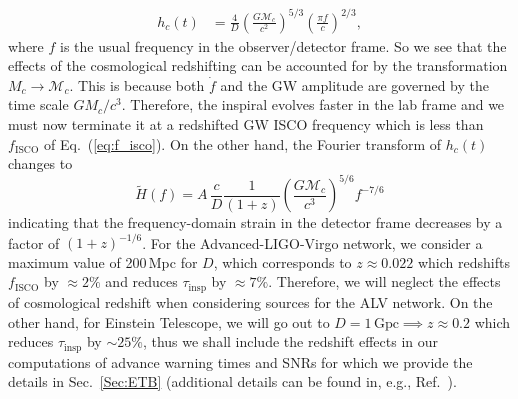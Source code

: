 \documentclass[prd,amsmath,amssymb,aps,floats,amsfonts,notitlepage,superscriptaddress,eqsecnum,nofootinbib,10pt]{revtex4-1}
\newcommand{\f}{\frac}
\newcommand{\be}{\begin{equation}}
\newcommand{\ee}{\end{equation}}
\begin{document}
\begin{enumerate}
\begin{align}
h_c(t) & = \f{4}{D}\left(\f{G \mathcal{M}_c}{c^2}\right)^{5/3}\left(\frac{\pi f}{c}\right)^{2/3} \label{eq:strain_TD_redshifted},
\end{align}
%
where $f$ is the usual frequency in the observer/detector frame.
So we see that the effects of the cosmological redshifting can be accounted for by the transformation $M_c\rightarrow \mathcal{M}_c$.
This is because both $\dot{f}$ and the GW amplitude are governed by the time scale $G M_c/c^3$.
Therefore, the inspiral evolves faster in the lab frame %
and we must now terminate it at a redshifted GW ISCO frequency which is less than $f_\text{ISCO}$ of Eq.~(\ref{eq:f_isco}).
On the other hand, the Fourier transform of $h_c(t)$ changes to 
%
\be
\tilde{H}(f) = A\, \f{c}{D} \f{1}{(1+z)} \left(\f{G \mathcal{M}_c}{c^3}\right)^{5/6} f^{-7/6}
\ee
indicating that the frequency-domain strain in the detector frame decreases by a factor of $(1+z)^{-1/6}$. %
%
For the Advanced-LIGO-Virgo network,
we consider a maximum value of 200\,Mpc for $D$,
which corresponds to $z \approx 0.022$ which redshifts $f_\text{ISCO}$ by $\approx 2\%$ and reduces $\tau_\text{insp}$ by $\approx 7\%$.
Therefore, we will neglect the effects of cosmological redshift 
when considering sources for the ALV network.
On the other hand, for Einstein Telescope, we will go out to $D=1\,\text{Gpc}\implies z\approx 0.2$
which reduces $\tau_\text{insp}$ by $\sim 25\%$, thus we shall include the redshift effects in our computations of advance warning times and SNRs
for which we provide the details in Sec.~\ref{Sec:ETB} (additional details can be found in, e.g., Ref.~\cite{Phinney:2001di}). 

%
\end{enumerate}
%
%
\end{document}
